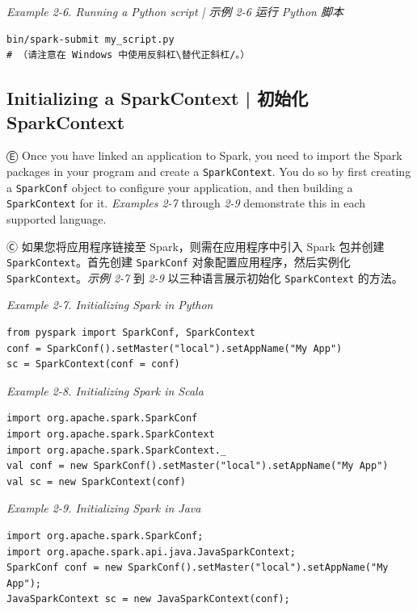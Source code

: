 {\emph{Example 2-6. Running a Python script  | 示例 2-6 运行 Python 脚本}

\begin{lstlisting}
bin/spark-submit my_script.py
# （请注意在 Windows 中使用反斜杠\替代正斜杠/。）
\end{lstlisting}

\subsection{Initializing a SparkContext  |  初始化 SparkContext}\label{initializing-a-sparkcontext}

Ⓔ \textcolor{etc}{Once you have linked an application to Spark, you need to import the Spark packages in your program and create a \lstinline{SparkContext}. You do so by first creating a \lstinline{SparkConf} object to configure your application, and then building a \lstinline{SparkContext} for it. \emph{Examples 2-7} through \emph{2-9} demonstrate this in each supported language.}

Ⓒ 如果您将应用程序链接至 Spark，则需在应用程序中引入 Spark
包并创建\lstinline{SparkContext}。首先创建 \lstinline{SparkConf}
对象配置应用程序，然后实例化\lstinline{SparkContext}。\emph{示例 2-7} 到
\emph{2-9} 以三种语言展示初始化 \lstinline{SparkContext} 的方法。

\emph{Example 2-7. Initializing Spark in Python}

\begin{lstlisting}
from pyspark import SparkConf, SparkContext
conf = SparkConf().setMaster("local").setAppName("My App")
sc = SparkContext(conf = conf)
\end{lstlisting}

\emph{Example 2-8. Initializing Spark in Scala}

\begin{lstlisting}
import org.apache.spark.SparkConf
import org.apache.spark.SparkContext
import org.apache.spark.SparkContext._
val conf = new SparkConf().setMaster("local").setAppName("My App")
val sc = new SparkContext(conf)
\end{lstlisting}

\emph{Example 2-9. Initializing Spark in Java}

\begin{lstlisting}
import org.apache.spark.SparkConf;
import org.apache.spark.api.java.JavaSparkContext;
SparkConf conf = new SparkConf().setMaster("local").setAppName("My App");
JavaSparkContext sc = new JavaSparkContext(conf);
\end{lstlisting}

}
